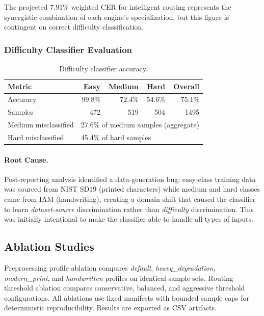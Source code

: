 \documentclass[12pt,a4paper]{article}
\begin{document}
The projected 7.91\% weighted CER for intelligent routing represents
the synergistic combination of each engine's specialization, but this
figure is contingent on correct difficulty classification.

\subsubsection{Difficulty Classifier Evaluation}
\label{sec:classifier_eval}

\begin{table}[H]
  \centering
  \small
  \begin{tabular}{lrrrr}
    \toprule
    \textbf{Metric} & \textbf{Easy} & \textbf{Medium}
    & \textbf{Hard} & \textbf{Overall} \\
    \midrule
    Accuracy      & 99.8\% & 72.4\% & 54.6\% & 75.1\% \\
    Samples       & 472    & 519    & 504    & 1495 \\
    \midrule
    Medium misclassified & \multicolumn{4}{l}{27.6\% of medium
      samples (aggregate)} \\
    Hard misclassified   & \multicolumn{4}{l}{45.4\% of hard
      samples} \\
    \bottomrule
  \end{tabular}
  \caption{Difficulty classifier accuracy.}
  \label{tab:classifier}
\end{table}

\paragraph{Root Cause.}
Post-reporting analysis identified a data-generation bug: easy-class
training data was sourced from NIST SD19 (printed characters) while
medium and hard classes came from IAM (handwriting), creating a
domain shift that caused the classifier to learn
\emph{dataset-source} discrimination rather than \emph{difficulty}
discrimination. This was initially intentional to make the classifier able to handle all types of inputs.

\subsection{Ablation Studies}

Preprocessing profile ablation compares \emph{default},
\emph{heavy\_degradation}, \emph{modern\_print}, and \emph{handwritten} profiles on
identical sample sets. Routing threshold ablation compares
conservative, balanced, and aggressive threshold configurations. All
ablations use fixed manifests with bounded sample caps for
deterministic reproducibility. Results are exported as CSV artifacts.
\end{document}
